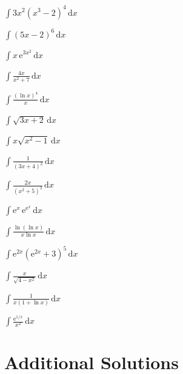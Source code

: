 \begin{problems}
  \item $\displaystyle\int 3x^{2}(x^{3}-2)^{4}\,\mathrm{d}x$
  \item $\displaystyle\int (5x-2)^{6}\,\mathrm{d}x$
  \item $\displaystyle\int x\,\mathrm{e}^{3x^{2}}\,\mathrm{d}x$
  \item $\displaystyle\int \frac{4x}{x^{2}+7}\,\mathrm{d}x$
  \item $\displaystyle\int \frac{(\ln x)^{4}}{x}\,\mathrm{d}x$
  \item $\displaystyle\int \sqrt{3x+2}\,\mathrm{d}x$
  \item $\displaystyle\int x\sqrt{x^{2}-1}\,\mathrm{d}x$
  \item $\displaystyle\int \frac{1}{(3x+4)^{2}}\,\mathrm{d}x$
  \item $\displaystyle\int \frac{2x}{(x^{2}+5)^{3}}\,\mathrm{d}x$
  \item $\displaystyle\int \mathrm{e}^{x}\,\mathrm{e}^{\mathrm{e}^{x}}\,\mathrm{d}x$
  \item $\displaystyle\int \frac{\ln(\ln x)}{x\ln x}\,\mathrm{d}x$
  \item $\displaystyle\int \mathrm{e}^{2x}(\mathrm{e}^{2x}+3)^{5}\,\mathrm{d}x$
  \item $\displaystyle\int \frac{x}{\sqrt{4-x^{2}}}\,\mathrm{d}x$
  \item $\displaystyle\int \frac{1}{x(1+\ln x)}\,\mathrm{d}x$
  \item $\displaystyle\int \frac{\mathrm{e}^{1/x}}{x^{2}}\,\mathrm{d}x$
\end{problems}

\section{Additional Solutions}

